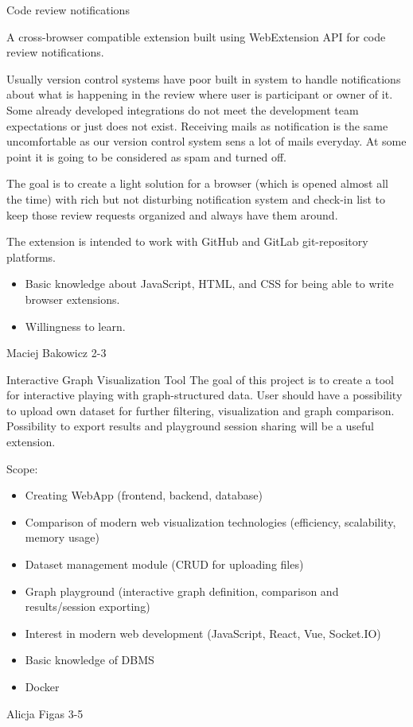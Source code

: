 \begin{project}
{Code review notifications}
{
A cross-browser compatible extension built using WebExtension API for code review notifications.

Usually version control systems have poor built in system to handle notifications about what is happening in the review where user is participant or owner of it. Some already developed integrations do not meet the development team expectations or just does not exist. Receiving mails as notification is the same uncomfortable as our version control system sens a lot of mails everyday. At some point it is going to be considered as spam and turned off.
} 
{
The goal is to create a light solution for a browser (which is opened almost all the time) with rich but not disturbing notification system and check-in list to keep those review requests organized and always have them around.

The extension is intended to work with GitHub and GitLab git-repository platforms.
}
{
\begin{itemize}
	\item Basic knowledge about JavaScript, HTML, and CSS for being able to write browser extensions.
	\item Willingness to learn.
\end{itemize}
}
{Maciej Bakowicz}
{2-3}
\end{project}
\begin{project}
{Interactive Graph Visualization Tool}
{The goal of this project is to create a tool for interactive playing with graph-structured data. User should have a possibility to upload own dataset for further filtering, visualization and graph comparison. Possibility to export results and playground session sharing will be a useful extension.}
{
Scope:
\begin{itemize}
	\item Creating WebApp (frontend, backend, database)
	\item Comparison of modern web visualization technologies (efficiency, scalability, memory usage)
	\item Dataset management module (CRUD for uploading files)
	\item Graph playground (interactive graph definition, comparison and results/session exporting)
\end{itemize}
}
{
\begin{itemize}
	\item Interest in modern web development (JavaScript, React, Vue, Socket.IO)
	\item Basic knowledge of DBMS
	\item Docker
\end{itemize}
}
{Alicja Figas}
{3-5}
\end{project}
